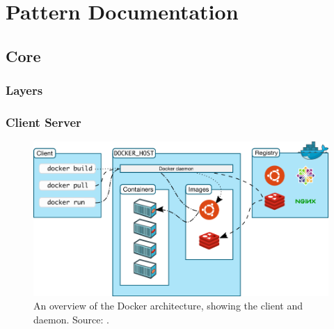
\clearpage
\chapter{Pattern Documentation}
\label{ch:patterns}


\section{Core}
\subsection{Layers}

\subsection{Client Server}
\begin{figure}[H]
\caption{An overview of the Docker architecture, showing the client and daemon. Source: \cite{dockerarchi}.}
\centering
\includegraphics[scale=0.4]{4-softwarearch/images/architecture.png}
\end{figure}

